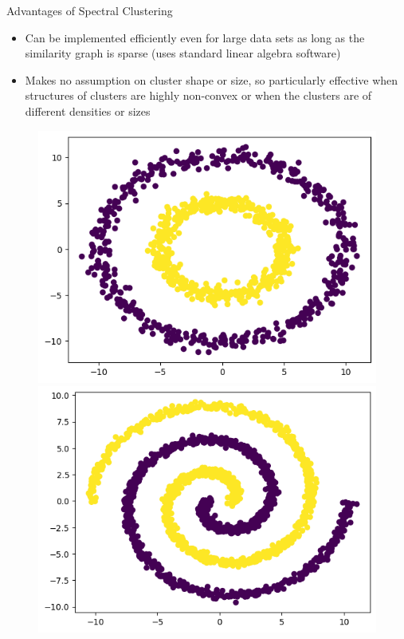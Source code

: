 \documentclass{beamer}
\begin{document}
\begin{frame}{Advantages of Spectral Clustering}
    \begin{itemize}
        \item Can be implemented efficiently even for large data sets as long as the similarity graph is sparse (uses standard linear algebra software)
        \item Makes no assumption on cluster shape or size, so particularly effective when structures of clusters are highly non-convex or when the clusters are of different densities or sizes
    \end{itemize}
    
    \begin{figure}
        \begin{minipage}[b]{0.4\textwidth}
            \includegraphics[width=\textwidth]{concentric_circles.png}
         \end{minipage}
        \hfill
        \begin{minipage}[b]{0.4\textwidth}
            \includegraphics[width=\textwidth]{interlacing_spirals_example.png}
        \end{minipage}
    \end{figure}
\end{frame}
\end{document}
